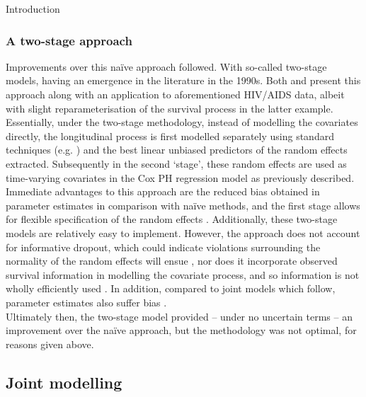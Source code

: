 \begin{chapter}{\label{cha:intro}Introduction}
  \subsubsection*{A two-stage approach}
  \addtocounter{subsubsection}{1}
  Improvements over this na\"{i}ve approach followed. With so-called two-stage models, having an emergence in the literature in the 1990s. Both \citet{Tsiatis1995} and \citet{DeGruttola1994} present this approach along with an application to aforementioned HIV/AIDS data, albeit with slight reparameterisation of the survival process in the latter example. Essentially, under the two-stage methodology, instead of modelling the covariates directly, the longitudinal process is first modelled separately using standard techniques (e.g. \citet{LairdWare1982}) and the best linear unbiased predictors of the random effects extracted. Subsequently in the second `stage', these random effects are used as time-varying covariates in the Cox PH regression model as previously described.\\ 
  Immediate advantages to this approach are the reduced bias obtained in parameter estimates \citep{Dafni1998} in comparison with na\"{i}ve methods, and the first stage allows for flexible specification of the random effects \citep{Bycott1998}. Additionally, these two-stage models are relatively easy to implement. However, the approach does not account for informative dropout, which could indicate violations surrounding the normality of the random effects will ensue \citep{Wulfsohn97, JMOverview}, nor does it incorporate observed survival information in modelling the covariate process, and so information is not wholly efficiently used \citep{Wulfsohn97}. In addition, compared to joint models which follow, parameter estimates also suffer bias \citep{Ibrahim2010}.\\
  Ultimately then, the two-stage model provided -- under no uncertain terms -- an improvement over the na\"{i}ve approach, but the methodology was not optimal, for reasons given above.
  
  \subsection{Joint modelling}

\end{chapter}
